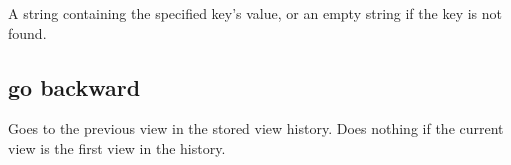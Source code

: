 \documentclass[letterpaper,12pt,english,openany,oneside]{sphinxmanual}
\begin{document}

A string containing the specified key’s value, or an empty string if the key is not found.

\label{\detokenize{IAC_API_AppleEvtObjects:applescript-example-18}}

\begin{sphinxVerbatim}[commandchars=\\\{\}]
     
\end{sphinxVerbatim}
\label{\detokenize{IAC_API_AppleEvtObjects:apple-event-id-9}}

\begin{sphinxVerbatim}[commandchars=\\\{\}]
 
\end{sphinxVerbatim}
\label{\detokenize{IAC_API_AppleEvtObjects:apple-event-parameters-3}}

\begin{sphinxVerbatim}[commandchars=\\\{\}]
 
\end{sphinxVerbatim}




\subsection{go backward}
\label{\detokenize{IAC_API_AppleEvtObjects:go-backward}}
Goes to the previous view in the stored view history. Does nothing if the current view is the first view in the history.

\label{\detokenize{IAC_API_AppleEvtObjects:syntax-22}}

\begin{sphinxVerbatim}[commandchars=\\\{\}]
 
 \PYG{p}{[}\PYG{p}{]}
\end{sphinxVerbatim}
\label{\detokenize{IAC_API_AppleEvtObjects:parameters-23}}
\end{document}
